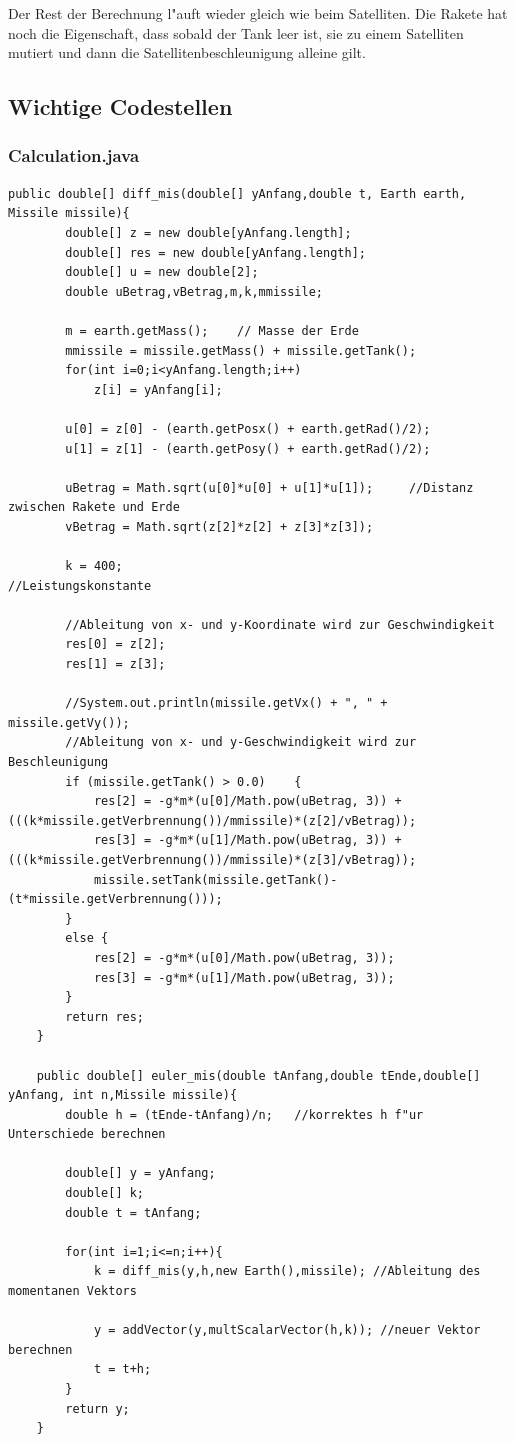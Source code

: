 \documentclass[11pt]{report}
\newenvironment{mylisting}
{\begin{list}{}{\setlength{\leftmargin}{1em}}\item\scriptsize\bfseries}
{\end{list}}
\begin{document}
Der Rest der Berechnung l"auft wieder gleich wie beim Satelliten. Die Rakete hat noch die Eigenschaft, dass sobald der Tank leer ist, sie zu einem Satelliten mutiert und dann die Satellitenbeschleunigung alleine gilt.

\newpage

\subsection{Wichtige Codestellen}
\subsubsection{Calculation.java}
\begin{mylisting}
\begin{verbatim}
public double[] diff_mis(double[] yAnfang,double t, Earth earth, Missile missile){
		double[] z = new double[yAnfang.length];
		double[] res = new double[yAnfang.length];
		double[] u = new double[2];
		double uBetrag,vBetrag,m,k,mmissile;

		m = earth.getMass();	// Masse der Erde
		mmissile = missile.getMass() + missile.getTank();
		for(int i=0;i<yAnfang.length;i++)
			z[i] = yAnfang[i];

		u[0] = z[0] - (earth.getPosx() + earth.getRad()/2);
		u[1] = z[1] - (earth.getPosy() + earth.getRad()/2);

		uBetrag = Math.sqrt(u[0]*u[0] + u[1]*u[1]);		//Distanz zwischen Rakete und Erde
		vBetrag = Math.sqrt(z[2]*z[2] + z[3]*z[3]);

		k = 400;											//Leistungskonstante

		//Ableitung von x- und y-Koordinate wird zur Geschwindigkeit
		res[0] = z[2];
		res[1] = z[3];

		//System.out.println(missile.getVx() + ", " + missile.getVy());
		//Ableitung von x- und y-Geschwindigkeit wird zur Beschleunigung
		if (missile.getTank() > 0.0)	{
			res[2] = -g*m*(u[0]/Math.pow(uBetrag, 3)) + (((k*missile.getVerbrennung())/mmissile)*(z[2]/vBetrag));
			res[3] = -g*m*(u[1]/Math.pow(uBetrag, 3)) + (((k*missile.getVerbrennung())/mmissile)*(z[3]/vBetrag));
			missile.setTank(missile.getTank()-(t*missile.getVerbrennung()));
		}
		else {
			res[2] = -g*m*(u[0]/Math.pow(uBetrag, 3));
			res[3] = -g*m*(u[1]/Math.pow(uBetrag, 3));
		}
		return res;
	}
 
	public double[] euler_mis(double tAnfang,double tEnde,double[] yAnfang, int n,Missile missile){
		double h = (tEnde-tAnfang)/n;	//korrektes h f"ur Unterschiede berechnen

		double[] y = yAnfang;
		double[] k;
		double t = tAnfang;

		for(int i=1;i<=n;i++){
			k = diff_mis(y,h,new Earth(),missile); //Ableitung des momentanen Vektors

			y = addVector(y,multScalarVector(h,k));	//neuer Vektor berechnen
			t = t+h;
		}
		return y;
	}
\end{verbatim}
\end{mylisting}
\end{document}
